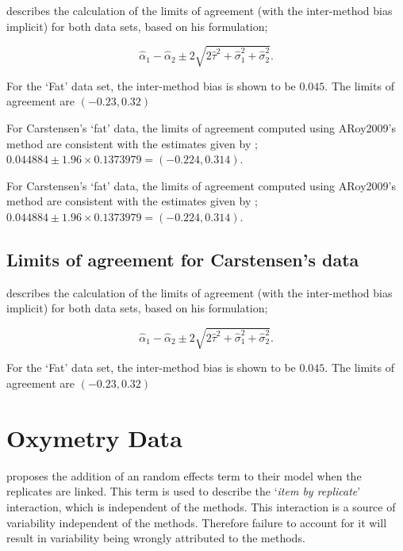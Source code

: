 \documentclass[12pt, a4paper]{report}
\theoremstyle{plain}
\theoremstyle{definition}
\theoremstyle{remark}
\begin{document}
	
	
	
	\citet{BXC2008} describes the calculation of the limits of agreement (with the inter-method bias implicit) for both data sets, based on his formulation;
	
	\[\hat{\alpha}_1 - \hat{\alpha}_2 \pm 2\sqrt{2\hat{\tau}^2 +\hat{\sigma}_1^2 +\hat{\sigma}_2^2 }.\]
	
	
	For the `Fat' data set, the inter-method bias is shown to be $0.045$. The limits of agreement are $(-0.23 , 0.32)$
	
	For Carstensen's `fat' data, the limits of agreement computed using ARoy2009's
	method are consistent with the estimates given by \citet{BXC2008}; $0.044884  \pm 1.96 \times  0.1373979 = (-0.224,  0.314).$
	
	
	
	For Carstensen's `fat' data, the limits of agreement computed using ARoy2009's
	method are consistent with the estimates given by \citet{BXC2008}; $0.044884  \pm 1.96 \times  0.1373979 = (-0.224,  0.314).$
	
	
	
	
	\subsection{Limits of agreement for Carstensen's data}
	
	
	\citet{BXC2008} describes the calculation of the limits of agreement (with the inter-method bias implicit) for both data sets, based on his formulation;
	
	\[\hat{\alpha}_1 - \hat{\alpha}_2 \pm 2\sqrt{2\hat{\tau}^2 +\hat{\sigma}_1^2 +\hat{\sigma}_2^2 }.\]
	
	For the `Fat' data set, the inter-method bias is shown to be $0.045$. The limits of agreement are $(-0.23 , 0.32)$
	
	
	
	\section{Oxymetry Data}
	\citet{BXC2008} proposes the addition of an random effects term to their model when the replicates are linked. This term is used to describe the `\textit{item by replicate}' interaction, which is independent of the methods. This interaction is a source of variability independent of the methods. Therefore failure to account for it will result in variability being wrongly attributed to the methods.
	
\end{document}
